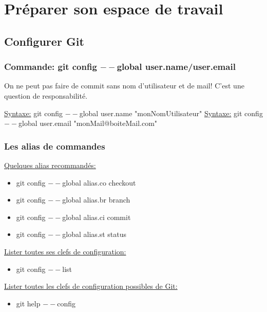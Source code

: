 \documentclass{beamer}
\begin{document}
\section{Préparer son espace de travail}

\subsection{Configurer Git}
\begin{frame}
\frametitle{Commande: git config $--$global user.name/user.email}
On ne peut pas faire de commit sans nom d'utilisateur et de mail! C'est une question de responsabilité.
\medskip

\underline{Syntaxe:} git config $--$global user.name "monNomUtilisateur"
\smallskip
\underline{Syntaxe:} git config $--$global user.email "monMail@boiteMail.com"
\medskip

\end{frame}

\begin{frame}
\frametitle{Les alias de commandes}

\underline{Quelques alias recommandés:}
\begin{itemize} 
    \item[] git config $--$global alias.co checkout
    \item[] git config $--$global alias.br branch
    \item[] git config $--$global alias.ci commit
    \item[] git config $--$global alias.st status
\end{itemize}
\medskip

\underline{Lister toutes ses clefs de configuration:}
\begin{itemize}
    \item[] git config $--$list
\end{itemize}
\medskip

\underline{Lister toutes les clefs de configuration possibles de Git:}
\begin{itemize}
    \item[] git help $--$config
\end{itemize}
\end{frame}

\end{document}
